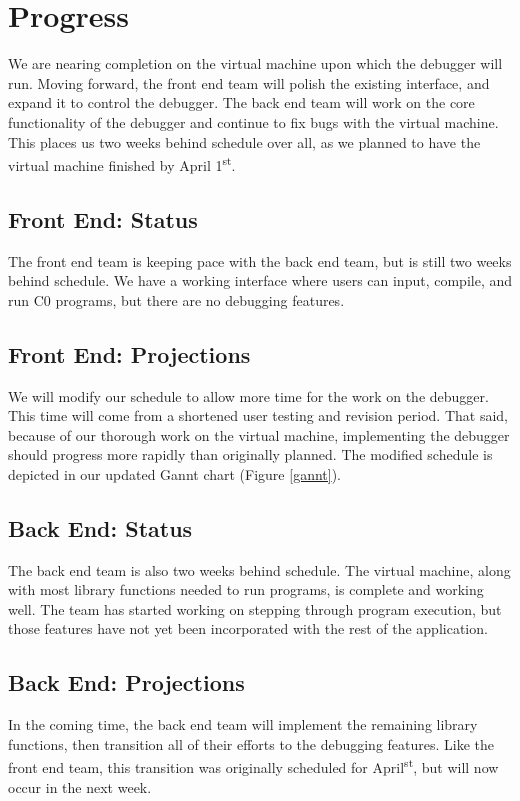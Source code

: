 \section{Progress}
We are nearing completion on the virtual machine upon which the debugger will
run. Moving forward, the front end team will polish the existing interface, and
expand it to control the debugger. The back end team will work on the core
functionality of the debugger and continue to fix bugs with the virtual machine.
This places us two weeks behind schedule over all, as we planned to have the
virtual machine finished by April 1\textsuperscript{st}.

\subsection*{Front End: Status}
The front end team is keeping pace with the back end team, but is still two
weeks behind schedule. We have a working interface where users can input,
compile, and run C0 programs, but there are no debugging features.

\subsection*{Front End: Projections}
We will modify our schedule to allow more time for the work on the debugger.
This time will come from a shortened user testing and revision period. That
said, because of our thorough work on the virtual machine, implementing the
debugger should progress more rapidly than originally planned. The modified
schedule is depicted in our updated Gannt chart (Figure \ref{gannt}).

\subsection*{Back End: Status}
The back end team is also two weeks behind schedule. The virtual machine, along
with most library functions needed to run programs, is complete and working
well. The team has started working on stepping through program execution, but
those features have not yet been incorporated with the rest of the application.

\subsection*{Back End: Projections}
In the coming time, the back end team will implement the remaining library
functions, then transition all of their efforts to the debugging features. Like
the front end team, this transition was originally scheduled for
April\textsuperscript{st}, but will now occur in the next week.

